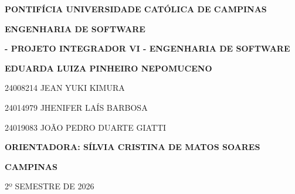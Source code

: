 \documentclass[
    12pt,           %
    oneside,        %
    a4paper,        %
    chapter=TITLE,  %
    english,        %
    brazil          %
]{abntex2}
\begin{document}
\begin{capa}
    \center

    {\bfseries\fontsize{12}{14}\selectfont PONTIFÍCIA UNIVERSIDADE CATÓLICA DE CAMPINAS}\par
    {\bfseries\fontsize{12}{14}\selectfont ENGENHARIA DE SOFTWARE}\par
    {\bfseries\fontsize{12}{14} - PROJETO INTEGRADOR VI - ENGENHARIA DE SOFTWARE}\par

    \vfill

    {\bfseries\fontsize{12}{14}\selectfont
        \imprimirtitulo\par}

    \vfill

    {\bfseries\fontsize{12}{16} EDUARDA LUIZA PINHEIRO NEPOMUCENO\par
        24008214 JEAN YUKI KIMURA\par
        24014979 JHENIFER LAÍS BARBOSA\par
        24019083 JOÃO PEDRO DUARTE GIATTI\par
    }

    \vfill

    {\bfseries\fontsize{12}{14}\selectfont
        ORIENTADORA: SÍLVIA CRISTINA DE MATOS SOARES\par
    }

    \vfill

    {\bfseries\fontsize{12}{14}\selectfont
        CAMPINAS\par
        2º SEMESTRE DE 2026\par
    }
\end{capa}
\end{document}
